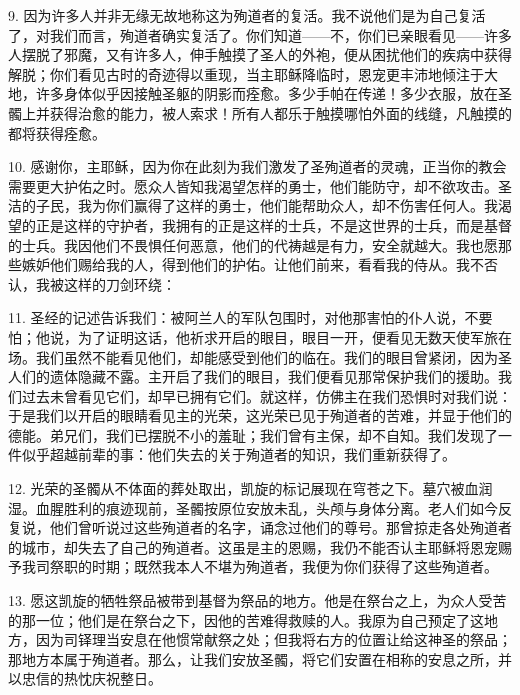 9. 因为许多人并非无缘无故地称这为殉道者的复活。我不说他们是为自己复活了，对我们而言，殉道者确实复活了。你们知道——不，你们已亲眼看见——许多人摆脱了邪魔，又有许多人，伸手触摸了圣人的外袍，便从困扰他们的疾病中获得解脱；你们看见古时的奇迹得以重现，当主耶稣降临时，恩宠更丰沛地倾注于大地，许多身体似乎因接触圣躯的阴影而痊愈。多少手帕在传递！多少衣服，放在圣髑上并获得治愈的能力，被人索求！所有人都乐于触摸哪怕外面的线缝，凡触摸的都将获得痊愈。\par

10. 感谢你，主耶稣，因为你在此刻为我们激发了圣殉道者的灵魂，正当你的教会需要更大护佑之时。愿众人皆知我渴望怎样的勇士，他们能防守，却不欲攻击。圣洁的子民，我为你们赢得了这样的勇士，他们能帮助众人，却不伤害任何人。我渴望的正是这样的守护者，我拥有的正是这样的士兵，不是这世界的士兵，而是基督的士兵。我因他们不畏惧任何恶意，他们的代祷越是有力，安全就越大。我也愿那些嫉妒他们赐给我的人，得到他们的护佑。让他们前来，看看我的侍从。我不否认，我被这样的刀剑环绕：\par

11. 圣经的记述告诉我们：被阿兰人的军队包围时，对他那害怕的仆人说，不要怕；他说，为了证明这话，他祈求开启的眼目，眼目一开，便看见无数天使军旅在场。我们虽然不能看见他们，却能感受到他们的临在。我们的眼目曾紧闭，因为圣人们的遗体隐藏不露。主开启了我们的眼目，我们便看见那常保护我们的援助。我们过去未曾看见它们，却早已拥有它们。就这样，仿佛主在我们恐惧时对我们说：于是我们以开启的眼睛看见主的光荣，这光荣已见于殉道者的苦难，并显于他们的德能。弟兄们，我们已摆脱不小的羞耻；我们曾有主保，却不自知。我们发现了一件似乎超越前辈的事：他们失去的关于殉道者的知识，我们重新获得了。\par

12. 光荣的圣髑从不体面的葬处取出，凯旋的标记展现在穹苍之下。墓穴被血润湿。血腥胜利的痕迹现前，圣髑按原位安放未乱，头颅与身体分离。老人们如今反复说，他们曾听说过这些殉道者的名字，诵念过他们的尊号。那曾掠走各处殉道者的城市，却失去了自己的殉道者。这虽是主的恩赐，我仍不能否认主耶稣将恩宠赐予我司祭职的时期；既然我本人不堪为殉道者，我便为你们获得了这些殉道者。\par

13. 愿这凯旋的牺牲祭品被带到基督为祭品的地方。他是在祭台之上，为众人受苦的那一位；他们是在祭台之下，因他的苦难得救赎的人。我原为自己预定了这地方，因为司铎理当安息在他惯常献祭之处；但我将右方的位置让给这神圣的祭品；那地方本属于殉道者。那么，让我们安放圣髑，将它们安置在相称的安息之所，并以忠信的热忱庆祝整日。\par


